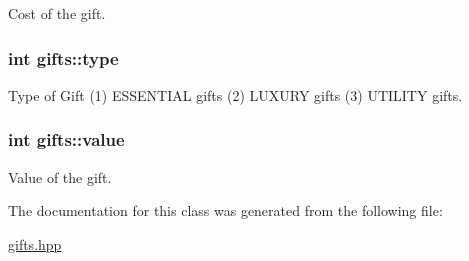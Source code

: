 Cost of the gift. 

\hypertarget{classgifts_acc6b677b2abb3dc88a65e33ce866ba09}{
\subsubsection[{type}]{\setlength{\rightskip}{0pt plus 5cm}int gifts\-::type}}\label{classgifts_acc6b677b2abb3dc88a65e33ce866ba09}


Type of Gift (1) E\-S\-S\-E\-N\-T\-I\-A\-L gifts (2) L\-U\-X\-U\-R\-Y gifts (3) U\-T\-I\-L\-I\-T\-Y gifts. 

\hypertarget{classgifts_a5cec737320153911ac8c721907ace3e2}{
\subsubsection[{value}]{\setlength{\rightskip}{0pt plus 5cm}int gifts\-::value}}\label{classgifts_a5cec737320153911ac8c721907ace3e2}


Value of the gift. 



The documentation for this class was generated from the following file\-:\begin{DoxyCompactItemize}
\item 
\hyperlink{gifts_8hpp}{gifts.\-hpp}\end{DoxyCompactItemize}
